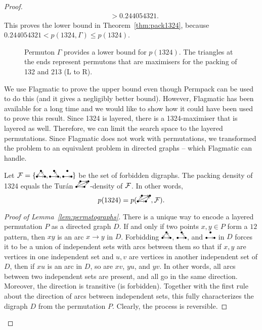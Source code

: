 \documentclass[12pt, a4paper, twoside]{report}
\begin{document}
\begin{proof}
\begin{align*}
& > 0.244054321.
\end{align*}
This proves the lower bound in Theorem~\ref{thm:pack1324}, because $0.244054321 < p(1324,\Gamma) \leq p(1324)$.
\begin{figure}[ht]
\centering
{}
\caption{\small{Permuton $\Gamma$ provides a lower bound for $p(1324)$. The triangles at the ends represent permutons that are maximisers for the packing of 132 and 213 (L to R).}}
\label{fig:gamma_constr}
\end{figure}

We use Flagmatic to prove the upper bound even though Permpack can be used to do this (and it gives a negligibly better bound). However, Flagmatic has been available for a long time and we would like to show how it could have been used to prove this result. Since 1324 is layered, there is a 1324-maximiser that is layered as well. Therefore, we can limit the search space to the layered permutations. Since Flagmatic does not work with permutations, we transformed the problem to an equivalent problem in directed graphs -- which Flagmatic can handle. 
\begin{lemma}
\label{lem:permstographs}
Let $\F = \{\dicycle, \twochain, \orcocherry\}$ be the set of forbidden digraphs.  The packing density of 1324 equals the Tur\'an $\digraphacbd$-density of $\mathcal{F}$. In other words, $$p(1324)= p(\digraphacbd, \F).$$
\end{lemma}
\begin{proof}[Proof of Lemma~\ref{lem:permstographs}]
There is a unique way to encode a layered permutation $P$ as a directed graph $D$. If and only if two points $x,y \in P$ form a $12$ pattern, then $xy$ is an arc $x \to y$ in $D$. Forbidding $\dicycle$, $\twochain$, and $\orcocherry$ in $D$ forces it to be a union of independent sets with arcs between them so that if $x,y$ are vertices in one independent set and $u,v$ are vertices in another independent set of $D$, then if $xu$ is an arc in $D$, so are $xv$, $yu$, and $yv$. In other words, all arcs between two independent sets are present, and all go in the same direction. Moreover, the direction is transitive (\dicycle is forbidden). Together with the first rule about the direction of arcs between independent sets, this fully characterizes the digraph $D$ from the permutation $P$. Clearly, the process is reversible.
\end{proof}


\end{proof}
\end{document}
